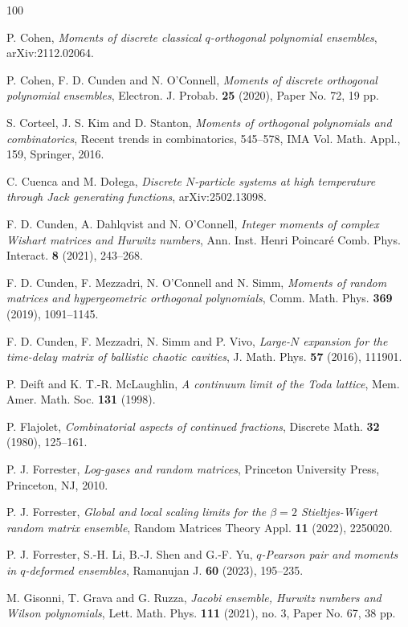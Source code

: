 \documentclass{amsart}
\theoremstyle{plain}
\theoremstyle{remark}
\numberwithin{equation}{section}
\begin{document}
\begin{thebibliography}{100}
  
 P. Cohen, \emph{Moments of discrete classical $q$-orthogonal polynomial ensembles}, arXiv:2112.02064. 
 
 P. Cohen, F. D. Cunden and N. O'Connell, \emph{Moments of discrete orthogonal polynomial ensembles}, Electron. J. Probab. \textbf{25} (2020), Paper No. 72, 19 pp.

 S. Corteel, J. S. Kim and D. Stanton, \emph{Moments of orthogonal polynomials and combinatorics}, Recent trends in combinatorics, 545–578, IMA Vol. Math. Appl., 159, Springer, 2016.

 C. Cuenca and M. Dołega, \emph{Discrete $N$-particle systems at high temperature through Jack generating functions}, arXiv:2502.13098. 

 F. D. Cunden, A. Dahlqvist and N. O’Connell, \emph{Integer moments of complex Wishart matrices and Hurwitz numbers}, Ann. Inst. Henri Poincaré Comb. Phys. Interact. \textbf{8} (2021), 243--268.

 F. D. Cunden, F. Mezzadri, N. O'Connell and N. Simm, \emph{Moments of random matrices and hypergeometric orthogonal polynomials}, Comm. Math. Phys. \textbf{369} (2019), 1091--1145.
 
 F. D. Cunden, F. Mezzadri, N. Simm and P. Vivo, \emph{Large-$N$ expansion for the time-delay matrix of ballistic chaotic cavities}, J. Math. Phys. \textbf{57} (2016), 111901.

 P. Deift and K. T.-R. McLaughlin, \textit{A continuum limit of the Toda lattice}, Mem. Amer. Math. Soc. \textbf{131} (1998).
 
 P. Flajolet, \emph{Combinatorial aspects of continued fractions}, Discrete Math. \textbf{32} (1980), 125--161.

 P. J. Forrester, \emph{Log-gases and random matrices}, Princeton University Press, Princeton, NJ, 2010.

 P. J. Forrester, \emph{Global and local scaling limits for the $\beta=2$ Stieltjes-Wigert random matrix ensemble}, Random Matrices Theory Appl. \textbf{11} (2022), 2250020. 
 

 P. J. Forrester, S.-H. Li, B.-J. Shen and G.-F. Yu, \emph{$q$-Pearson pair and moments in $q$-deformed ensembles}, Ramanujan J. \textbf{60} (2023), 195--235.
 


 M. Gisonni, T. Grava and G. Ruzza, \emph{Jacobi ensemble, Hurwitz numbers and Wilson polynomials}, Lett. Math. Phys. \textbf{111} (2021), no. 3, Paper No. 67, 38 pp. 
  


\end{thebibliography}
\end{document}
